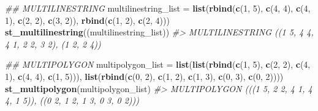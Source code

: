 \documentclass[]{krantz}
\newenvironment{Shaded}{\begin{snugshade}}{\end{snugshade}}
\newcommand{\CommentTok}[1]{\textcolor[rgb]{0.37,0.37,0.37}{\textit{#1}}}
\newcommand{\DecValTok}[1]{\textcolor[rgb]{0.06,0.06,0.06}{#1}}
\newcommand{\KeywordTok}[1]{\textcolor[rgb]{0.27,0.27,0.27}{\textbf{#1}}}
\newcommand{\NormalTok}[1]{#1}
\newcommand{\StringTok}[1]{\textcolor[rgb]{0.5,0.5,0.5}{#1}}
\begin{document}
\begin{Shaded}
\begin{Highlighting}[]
\CommentTok{## MULTILINESTRING}
\NormalTok{multilinestring_list =}\StringTok{ }\KeywordTok{list}\NormalTok{(}\KeywordTok{rbind}\NormalTok{(}\KeywordTok{c}\NormalTok{(}\DecValTok{1}\NormalTok{, }\DecValTok{5}\NormalTok{), }\KeywordTok{c}\NormalTok{(}\DecValTok{4}\NormalTok{, }\DecValTok{4}\NormalTok{), }\KeywordTok{c}\NormalTok{(}\DecValTok{4}\NormalTok{, }\DecValTok{1}\NormalTok{), }\KeywordTok{c}\NormalTok{(}\DecValTok{2}\NormalTok{, }\DecValTok{2}\NormalTok{), }\KeywordTok{c}\NormalTok{(}\DecValTok{3}\NormalTok{, }\DecValTok{2}\NormalTok{)), }
                            \KeywordTok{rbind}\NormalTok{(}\KeywordTok{c}\NormalTok{(}\DecValTok{1}\NormalTok{, }\DecValTok{2}\NormalTok{), }\KeywordTok{c}\NormalTok{(}\DecValTok{2}\NormalTok{, }\DecValTok{4}\NormalTok{)))}
\KeywordTok{st_multilinestring}\NormalTok{((multilinestring_list))}
\CommentTok{#> MULTILINESTRING ((1 5, 4 4, 4 1, 2 2, 3 2), (1 2, 2 4))}
\end{Highlighting}
\end{Shaded}

\begin{Shaded}
\begin{Highlighting}[]
\CommentTok{## MULTIPOLYGON}
\NormalTok{multipolygon_list =}\StringTok{ }\KeywordTok{list}\NormalTok{(}\KeywordTok{list}\NormalTok{(}\KeywordTok{rbind}\NormalTok{(}\KeywordTok{c}\NormalTok{(}\DecValTok{1}\NormalTok{, }\DecValTok{5}\NormalTok{), }\KeywordTok{c}\NormalTok{(}\DecValTok{2}\NormalTok{, }\DecValTok{2}\NormalTok{), }\KeywordTok{c}\NormalTok{(}\DecValTok{4}\NormalTok{, }\DecValTok{1}\NormalTok{), }\KeywordTok{c}\NormalTok{(}\DecValTok{4}\NormalTok{, }\DecValTok{4}\NormalTok{), }\KeywordTok{c}\NormalTok{(}\DecValTok{1}\NormalTok{, }\DecValTok{5}\NormalTok{))),}
                         \KeywordTok{list}\NormalTok{(}\KeywordTok{rbind}\NormalTok{(}\KeywordTok{c}\NormalTok{(}\DecValTok{0}\NormalTok{, }\DecValTok{2}\NormalTok{), }\KeywordTok{c}\NormalTok{(}\DecValTok{1}\NormalTok{, }\DecValTok{2}\NormalTok{), }\KeywordTok{c}\NormalTok{(}\DecValTok{1}\NormalTok{, }\DecValTok{3}\NormalTok{), }\KeywordTok{c}\NormalTok{(}\DecValTok{0}\NormalTok{, }\DecValTok{3}\NormalTok{), }\KeywordTok{c}\NormalTok{(}\DecValTok{0}\NormalTok{, }\DecValTok{2}\NormalTok{))))}
\KeywordTok{st_multipolygon}\NormalTok{(multipolygon_list)}
\CommentTok{#> MULTIPOLYGON (((1 5, 2 2, 4 1, 4 4, 1 5)), ((0 2, 1 2, 1 3, 0 3, 0 2)))}
\end{Highlighting}
\end{Shaded}
\end{document}
